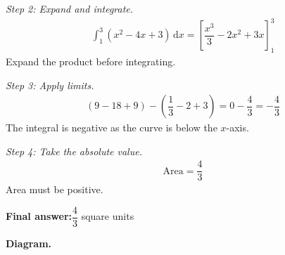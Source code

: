 \documentclass[11pt]{article}
\begin{document}
\textit{Step 2: Expand and integrate.}
\[\begin{gathered}
\int_1^3 (x^2 - 4x + 3)\, \mathrm{d}x = \left[\dfrac{x^3}{3} - 2x^2 + 3x\right]_1^3
\end{gathered}\]
Expand the product before integrating.

\textit{Step 3: Apply limits.}
\[\begin{gathered}
(9 - 18 + 9) - \left(\dfrac{1}{3} - 2 + 3\right) = 0 - \dfrac{4}{3} = -\dfrac{4}{3}
\end{gathered}\]
The integral is negative as the curve is below the \( x \)-axis.

\textit{Step 4: Take the absolute value.}
\[\begin{gathered}
\text{Area} = \dfrac{4}{3}
\end{gathered}\]
Area must be positive.

\begin{answerbox}
\textbf{Final answer:}\quad \(\displaystyle \dfrac{4}{3}\) square units
\end{answerbox}
\textbf{Diagram.}
\end{document}
